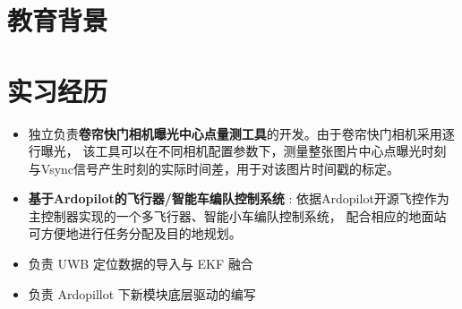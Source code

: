 \documentclass{resume}
\begin{document}


 

\section{教育背景}


\vspace{1ex}
\section{实习经历}
\begin{itemize}
  \item 独立负责\textbf{卷帘快门相机曝光中心点量测工具}的开发。由于卷帘快门相机采用逐行曝光，
  该工具可以在不同相机配置参数下，测量整张图片中心点曝光时刻与Vsync信号产生时刻的实际时间差，用于对该图片时间戳的标定。
\end{itemize}

\begin{itemize}
  \item \textbf{基于Ardopilot的飞行器/智能车编队控制系统} : 依据Ardopilot开源飞控作为主控制器实现的一个多飞行器、智能小车编队控制系统，
  配合相应的地面站 可方便地进行任务分配及目的地规划。
  \item 负责 UWB 定位数据的导入与 EKF 融合 
  \item 负责 Ardopillot 下新模块底层驱动的编写 
\end{itemize}


\end{document}
